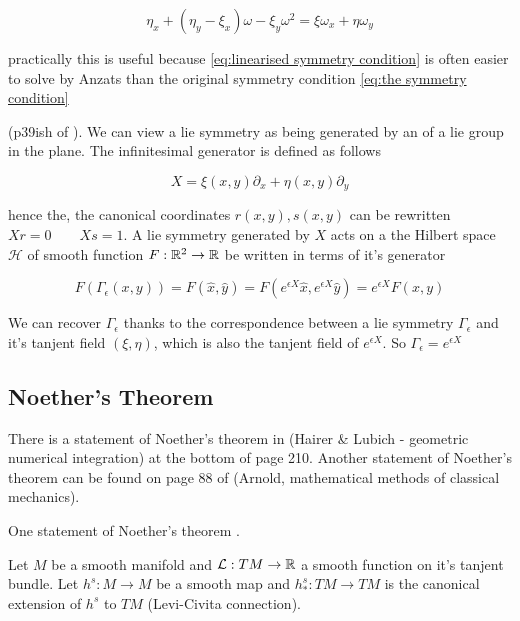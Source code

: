 \documentclass[12pt]{article}
\begin{document}
\begin{equation}\label{eq:linearised symmetry condition}
    \eta_x + (\eta_y - \xi_x)\omega - \xi_y\omega^2 = \xi \omega_x + \eta \omega_y
\end{equation}

practically this is useful because \eqref{eq:linearised symmetry condition} is often easier to solve by Anzats than the original symmetry condition \eqref{eq:the symmetry condition}

(p39ish of \cite{Symmetry-methods}). We can view a lie symmetry as being generated by an  of a lie group in the plane. The infinitesimal generator is defined as follows

\begin{equation}\label{eq:infinitesimal operator}
    X = \xi(x,y)\partial_x + \eta(x,y)\partial_y
\end{equation}

hence the, the canonical coordinates $r(x,y),s(x,y)$ can be rewritten $Xr = 0\qquad Xs = 1$. A lie symmetry generated by $X$ acts on a the Hilbert space $\mathcal H$ of smooth function $F : \mathbb{R}^2 \to \mathbb{R}$ be written in terms of it's generator

\begin{equation}\label{eq:generator of lie symmetry}
    F(\Gamma_\epsilon (x,y)) = F(\hat x,\hat y) = F(e^{\epsilon X}\hat x , e^{\epsilon X}\hat y) = e^{\epsilon X} F(x,y)
\end{equation}

We can recover $\Gamma_\epsilon$ thanks to the correspondence between a lie symmetry $\Gamma_\epsilon$ and it's tanjent field $(\xi,\eta)$, which is also the tanjent field of $e^{\epsilon X}$. So $\Gamma_\epsilon = e^{\epsilon X}$ 

\subsection{Noether's Theorem}

There is a statement of Noether's theorem in \cite{Numerical} (Hairer \& Lubich - geometric numerical integration) at the bottom of page 210. Another statement of Noether's theorem can be found on page 88 of \cite{Arnold} (Arnold, mathematical methods of classical mechanics). 

One statement of Noether's theorem \cite{Arnold}.

Let $M$ be a smooth manifold and $\mathcal L : TM\to \mathbb{R}$ a smooth function on it's tanjent bundle. Let $h^s : M\to M$ be a smooth map and $h^s_* : TM\to TM$ is the canonical extension of $h^s$ to $TM$ (Levi-Civita connection).
\end{document}
